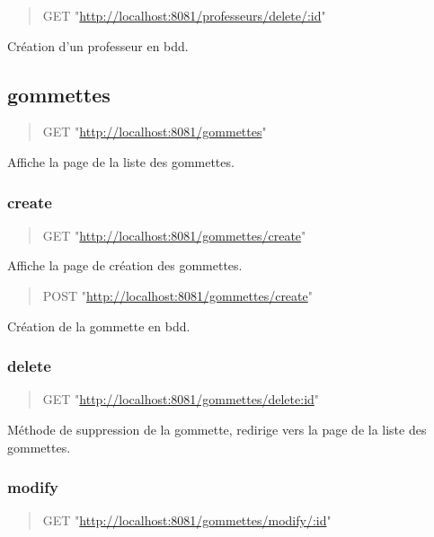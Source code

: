 \documentclass[11pt]{article}
\begin{document}
\begin{quote}
GET "\url{http://localhost:8081/professeurs/delete/:id}"
\end{quote}

Création d'un professeur en bdd.

\subsection{gommettes}
\label{sec:org273d842}

\begin{quote}
GET "\url{http://localhost:8081/gommettes}"
\end{quote}

Affiche la page de la liste des gommettes.

\subsubsection{create}
\label{sec:orgc680f84}

\begin{quote}
GET "\url{http://localhost:8081/gommettes/create}"
\end{quote}

Affiche la page de création des gommettes.

\begin{quote}
POST "\url{http://localhost:8081/gommettes/create}"
\end{quote}

Création de la gommette en bdd.

\subsubsection{delete}
\label{sec:orgf35e9fe}

\begin{quote}
GET "\url{http://localhost:8081/gommettes/delete:id}"
\end{quote}

Méthode de suppression de la gommette, redirige vers la page de la liste
des gommettes.

\subsubsection{modify}
\label{sec:org704f0d8}

\begin{quote}
GET "\url{http://localhost:8081/gommettes/modify/:id}"
\end{quote}
\end{document}
